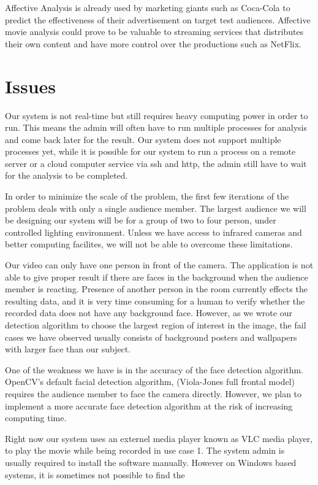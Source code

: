 \documentclass[12pt,a4paper,man]{report}
\begin{document}
Affective Analysis is already used by marketing giants such as Coca-Cola to predict the effectiveness of their advertisement on target test audiences. Affective movie analysis could prove to be valuable to streaming services that distributes their own content and have more control over the productions such as NetFlix.

\chapter{Issues}
\label{sec:org03c9183}
Our system is not real-time but still requires heavy computing power in order to run. This means the admin will often have to run multiple processes for analysis and come back later for the result. Our system does not support multiple processes yet, while it is possible for our system to run a process on a remote server or a cloud computer service via ssh and http, the admin still have to wait for the analysis to be completed. 

In order to minimize the scale of the problem, the first few iterations of the problem deals with only a single audience member. The largest audience we will be designing our system will be for a group of two to four person, under controlled lighting environment. Unless we have access to infrared cameras and better computing facilites, we will not be able to overcome these limitations. 

Our video can only have one person in front of the camera. The application is not able to give proper result if there are faces in the background when the audience member is reacting. Presence of another person in the room currently effects the resulting data, and it is very time consuming for a human to verify whether the recorded data does not have any background face. However, as we wrote our detection algorithm to choose the largest region of interest in the image, the fail cases we have observed usually consists of background posters and wallpapers with larger face than our subject.

One of the weakness we have is in the accuracy of the face detection algorithm. OpenCV's default facial detection algorithm, (Viola-Jones full frontal model) requires the audience member to face the camera directly. However, we plan to implement a more accurate face detection algorithm at the risk of increasing computing time.

Right now our system uses an externel media player known as VLC media player, to play the movie while being recorded in use case 1. The system admin is usually required to install the software manually. However on Windows based systems, it is sometimes not possible to find the 
\end{document}

